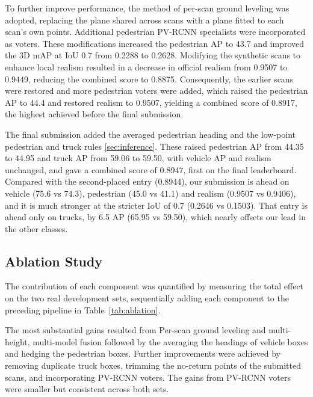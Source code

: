 \documentclass[conference]{IEEEtran}
\newcommand{\ph}[1]{\textcolor{red}{[#1]}}
\begin{document}
To further improve performance, the method of per-scan ground leveling was adopted, replacing the plane shared across scans with a plane fitted to each scan’s own points. Additional pedestrian PV-RCNN specialists were incorporated as voters. These modifications increased the pedestrian AP to 43.7 and improved the 3D mAP at IoU 0.7 from 0.2288 to 0.2628. Modifying the synthetic scans to enhance local realism resulted in a decrease in official realism from 0.9507 to 0.9449, reducing the combined score to 0.8875. Consequently, the earlier scans were restored and more pedestrian voters were added, which raised the pedestrian AP to 44.4 and restored realism to 0.9507, yielding a combined score of 0.8917, the highest achieved before the final submission.



The final submission added the averaged pedestrian heading and the low-point pedestrian and truck rules \ref{sec:inference}. These raised pedestrian AP from 44.35 to 44.95 and truck AP from 59.06 to 59.50, with vehicle AP and realism unchanged, and gave a combined score of 0.8947, first on the final leaderboard. Compared with the second-placed entry (0.8944), our submission is ahead on vehicle (75.6 vs 74.3), pedestrian (45.0 vs 41.1) and realism (0.9507 vs 0.9406), and it is much stronger at the stricter IoU of 0.7 (0.2646 vs 0.1503). That entry is ahead only on trucks, by 6.5 AP (65.95 vs 59.50), which nearly offsets our lead in the other classes. 




\subsection{Ablation Study}

The contribution of each component was quantified by measuring the total effect on the two real development sets, sequentially adding each component to the preceding pipeline in Table~\ref{tab:ablation}.

The most substantial gains resulted from Per-scan ground leveling and multi-height, multi-model fusion followed by the averaging the headings of vehicle boxes and hedging the pedestrian boxes. Further improvements were achieved by removing duplicate truck boxes, trimming the no-return points of the submitted scans, and incorporating PV-RCNN voters. The gains from PV-RCNN voters were smaller but consistent across both sets.
\end{document}
